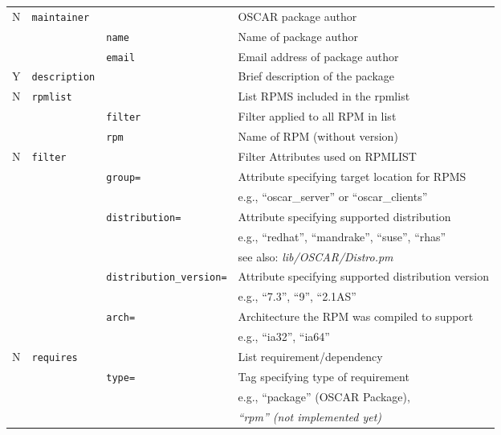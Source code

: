 \begin{table}[htbp]
\begin{center}
\begin{tabular}{|c|l|l|l|}
  N & \verb(maintainer(& & OSCAR package author                      \\\cline{3-4}
    & & \verb(name(   & Name of package author                    \\\cline{3-4}
    & & \verb(email(  & Email address of package author           \\\hline


  Y & \verb(description(&& Brief description of the package              \\ \hline


  N & \verb(rpmlist(&    & List RPMS included in the rpmlist         \\\cline{3-4}
    & & \verb(filter( & Filter applied to all RPM in list         \\\cline{3-4}
    & & \verb(rpm(    & Name of RPM (without version)             \\\hline


  N & \verb(filter(&     & Filter Attributes used on RPMLIST                 \\\cline{3-4}
    & & \verb(group=(   & Attribute specifying target location for RPMS     \\
    & &                 & e.g., ``oscar\_server'' or ``oscar\_clients''     \\\cline{3-4}
    & & \verb(distribution=(& Attribute specifying supported distribution   \\
    & &                 & e.g., ``redhat'', ``mandrake'', ``suse'', ``rhas''\\
    & &                 & see also: \emph{lib/OSCAR/Distro.pm}              \\\cline{3-4}
    & & \verb(distribution_version=(& Attribute specifying supported distribution version  \\
    & &                 & e.g., ``7.3'', ``9'', ``2.1AS''                   \\\cline{3-4}
    & & \verb(arch=(    & Architecture the RPM was compiled to support      \\
    & &                 & e.g., ``ia32'', ``ia64''                          \\\hline


  N & \verb(requires(&   & List requirement/dependency                \\\cline{3-4}
    & & \verb(type=(    & Tag specifying type of requirement         \\
    & &                 &  e.g., ``package'' (OSCAR Package),        \\
    & &                 &  \emph{``rpm'' (not implemented yet)}      \\\hline




\end{tabular}
\end{center}
\end{table}
